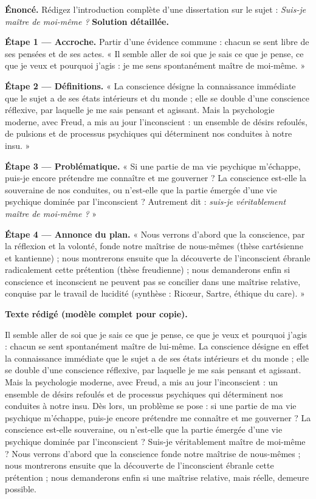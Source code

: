 \documentclass[11pt]{article}
\newcommand{\cle}[1]{{\popxbold\color{popdark}#1}}
\begin{document}
\begin{exoresolu}
\textbf{Énoncé.} Rédigez l'introduction complète d'une dissertation sur le sujet : \emph{Suis-je maître de moi-même ?}
\tcblower
\textbf{Solution détaillée.}

\textbf{Étape 1 — Accroche.} Partir d'une évidence commune : chacun se sent libre de ses pensées et de ses actes. « Il semble aller de soi que je sais ce que je pense, ce que je veux et pourquoi j'agis : je me sens spontanément maître de moi-même. »

\textbf{Étape 2 — Définitions.} « La \cle{conscience} désigne la connaissance immédiate que le sujet a de ses états intérieurs et du monde ; elle se double d'une conscience réflexive, par laquelle je me sais pensant et agissant. Mais la psychologie moderne, avec Freud, a mis au jour l'\cle{inconscient} : un ensemble de désirs refoulés, de pulsions et de processus psychiques qui déterminent nos conduites à notre insu. »

\textbf{Étape 3 — Problématique.} « Si une partie de ma vie psychique m'échappe, puis-je encore prétendre me connaître et me gouverner ? La conscience est-elle la souveraine de nos conduites, ou n'est-elle que la partie émergée d'une vie psychique dominée par l'inconscient ? Autrement dit : \emph{suis-je véritablement maître de moi-même ?} »

\textbf{Étape 4 — Annonce du plan.} « Nous verrons d'abord que la conscience, par la réflexion et la volonté, fonde notre maîtrise de nous-mêmes (thèse cartésienne et kantienne) ; nous montrerons ensuite que la découverte de l'inconscient ébranle radicalement cette prétention (thèse freudienne) ; nous demanderons enfin si conscience et inconscient ne peuvent pas se concilier dans une maîtrise relative, conquise par le travail de lucidité (synthèse : Ricœur, Sartre, éthique du care). »

\textbf{Texte rédigé (modèle complet pour copie).}

Il semble aller de soi que je sais ce que je pense, ce que je veux et pourquoi j'agis : chacun se sent spontanément maître de lui-même. La \cle{conscience} désigne en effet la connaissance immédiate que le sujet a de ses états intérieurs et du monde ; elle se double d'une conscience réflexive, par laquelle je me sais pensant et agissant. Mais la psychologie moderne, avec Freud, a mis au jour l'\cle{inconscient} : un ensemble de désirs refoulés et de processus psychiques qui déterminent nos conduites à notre insu. Dès lors, un problème se pose : si une partie de ma vie psychique m'échappe, puis-je encore prétendre me connaître et me gouverner ? La conscience est-elle souveraine, ou n'est-elle que la partie émergée d'une vie psychique dominée par l'inconscient ? Suis-je véritablement maître de moi-même ? Nous verrons d'abord que la conscience fonde notre maîtrise de nous-mêmes ; nous montrerons ensuite que la découverte de l'inconscient ébranle cette prétention ; nous demanderons enfin si une maîtrise relative, mais réelle, demeure possible.


\end{exoresolu}
\end{document}
